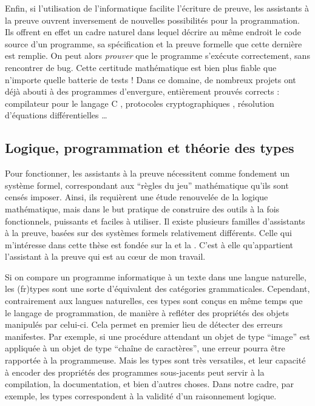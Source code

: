 Enfin, si l’utilisation de l’informatique facilite l’écriture de preuve,
les assistants à la preuve ouvrent inversement
de nouvelles possibilités pour la programmation.
Ils offrent en effet un cadre naturel dans lequel décrire au même endroit
le code source d’un programme, sa spécification et la preuve formelle que cette 
dernière est remplie. On peut alors \emph{prouver} que le
programme s’exécute correctement, sans rencontrer de bug.
Cette certitude mathématique est bien plus fiable que n’importe quelle batterie de tests !
Dans ce domaine, de nombreux projets ont déjà abouti à des programmes d’envergure,
entièrement prouvés corrects : compilateur pour le langage C ,
protocoles cryptographiques ,
résolution d’équations différentielles …

\subsection{Logique, programmation et théorie des types}

Pour fonctionner, les assistants à la preuve nécessitent comme fondement un système
formel, correspondant aux “règles du jeu” mathématique qu’ils sont censés imposer.
Ainsi, ils requièrent une étude renouvelée de la logique mathématique, mais dans le but
pratique de construire des outils à la fois fonctionnels,
puissants et faciles à utiliser.
Il existe plusieurs familles d’assistants à la preuve, basées sur des
systèmes formels relativement différents. Celle qui m’intéresse dans cette thèse
est fondée sur la 
et la .
C’est à elle qu’appartient l’assistant à la preuve  qui est au cœur de mon
travail.

Si on compare un programme informatique à un texte dans une langue naturelle,
les \intro(fr){types} sont une sorte d’équivalent des catégories grammaticales.
Cependant, contrairement aux langues naturelles, ces types sont conçus
en même temps que le langage de programmation,
de manière à refléter des propriétés des objets manipulés par celui-ci.
Cela permet en premier lieu de détecter des erreurs manifestes.
Par exemple, si une procédure attendant un objet de type “image” est
appliquée à un objet de type “chaîne de caractères”, une erreur pourra être rapportée
à la programmeuse.%
Mais les types sont très versatiles, et leur capacité à encoder
des propriétés des programmes sous-jacents peut servir à la compilation, la
documentation, et bien d’autres choses.
Dans notre cadre, par exemple, les types correspondent à la validité d’un raisonnement logique.

